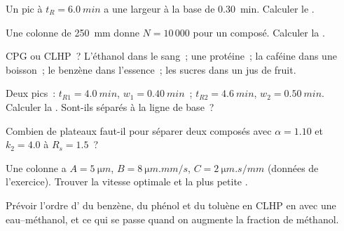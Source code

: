 \begin{exercise}[$\star$]\label{exo:b2:chromatography:2}
Un pic à $t_R = \qty{6.0}{min}$ a une largeur à la base de \qty{0.30}{min}. Calculer le .
\end{exercise}

\begin{exercise}[$\star$]\label{exo:b2:chromatography:3}
Une colonne de \qty{250}{mm} donne $N = 10\,000$ pour un composé. Calculer la .
\end{exercise}

\begin{exercise}[$\star$]\label{exo:b2:chromatography:4}
CPG ou CLHP~? L'éthanol dans le sang~; une protéine~; la caféine dans une boisson~; le benzène dans l'essence~; les sucres dans un jus de fruit.
\end{exercise}

\begin{exercise}[$\star\star$]\label{exo:b2:chromatography:5}
Deux pics~: $t_{R1} = \qty{4.0}{min}$, $w_1 = \qty{0.40}{min}$~; $t_{R2} = \qty{4.6}{min}$, $w_2 =
\qty{0.50}{min}$. Calculer la . Sont-ils séparés à la ligne de base~?
\end{exercise}

\begin{exercise}[$\star\star$]\label{exo:b2:chromatography:6}
Combien de plateaux faut-il pour séparer deux composés avec $\alpha = 1.10$ et $k_2 = 4.0$ à
$R_s = 1.5$~?
\end{exercise}

\begin{exercise}[$\star\star$]\label{exo:b2:chromatography:7}
Une colonne a $A = \qty{5}{\micro m}$, $B = \qty{8}{\micro m.mm/s}$, $C = \qty{2}{\micro m.s/mm}$
(données de l'exercice). Trouver la vitesse optimale et la plus petite .
\end{exercise}

\begin{exercise}[$\star\star$]\label{exo:b2:chromatography:8}
Prévoir l'ordre d' du benzène, du phénol et du toluène en CLHP en  avec une  eau--méthanol, et ce qui se passe quand on augmente la fraction de méthanol.
\end{exercise}

